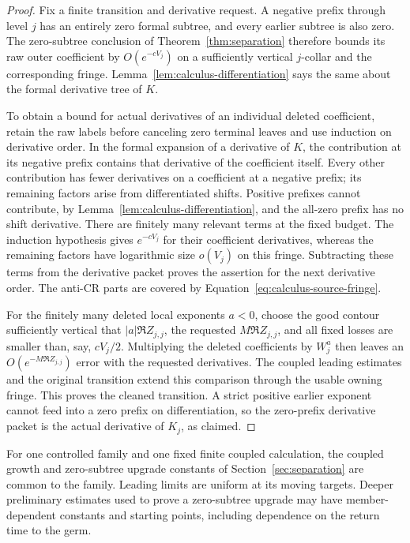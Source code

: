 \begin{proof}
Fix a finite transition and derivative request.  A negative prefix through
level $j$ has an entirely zero formal subtree, and every earlier subtree
is also zero.  The zero-subtree conclusion of
Theorem~\ref{thm:separation} therefore bounds its raw outer coefficient by
$O(e^{-cV_j})$ on a sufficiently vertical $j$-collar and the corresponding
fringe.  Lemma~\ref{lem:calculus-differentiation} says the same about the
formal derivative tree of $K$.

To obtain a bound for actual derivatives of an individual deleted
coefficient, retain the raw labels before canceling zero terminal leaves
and use induction on derivative order.  In the formal expansion
of a derivative of $K$, the contribution at its negative prefix contains
that derivative of the coefficient itself.  Every other contribution has
fewer derivatives on a coefficient at a negative prefix; its remaining
factors arise from differentiated shifts.  Positive prefixes cannot
contribute, by Lemma~\ref{lem:calculus-differentiation}, and the all-zero
prefix has no shift derivative.  There are finitely many relevant terms
at the fixed budget.  The induction hypothesis gives $e^{-cV_j}$ for their
coefficient derivatives, whereas the remaining factors have logarithmic
size $o(V_j)$ on this fringe.  Subtracting these terms from the derivative
packet proves the assertion for the next derivative order.  The anti-CR
parts are covered by Equation~\eqref{eq:calculus-source-fringe}.

For the finitely many deleted local exponents $a<0$, choose the good
contour sufficiently vertical that
$|a|\Re Z_{j,j}$, the requested $M\Re Z_{j,j}$, and all fixed losses are
smaller than, say, $cV_j/2$.  Multiplying the deleted coefficients by
$W_j^a$ then leaves an $O(e^{-M\Re Z_{j,j}})$ error with the requested
derivatives.  The coupled leading estimates and the original transition
extend this comparison through the usable owning fringe.  This proves the
cleaned transition.  A strict positive earlier exponent cannot feed into a
zero prefix on differentiation, so the zero-prefix derivative packet is
the actual derivative of $K_j$, as claimed.
\end{proof}

\begin{lemma}
\label{lem:calculus-uniform-separation}
For one controlled family and one fixed finite coupled calculation,
the coupled growth and zero-subtree upgrade constants of
Section~\ref{sec:separation} are common to the family.  Leading limits
are uniform at its moving targets.  Deeper preliminary estimates used to
prove a zero-subtree upgrade may have member-dependent constants and
starting points, including dependence on the return time to the germ.
\end{lemma}

